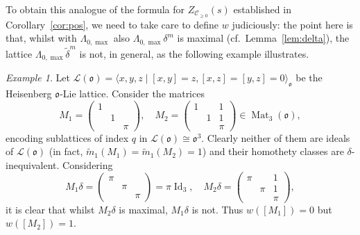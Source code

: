 \documentclass[11pt]{amsart}
\numberwithin{equation}{section}
\numberwithin{figure}{section}
\theoremstyle{plain}
\theoremstyle{definition}
\theoremstyle{remark}
\newtheorem{example}[theorem]{Example}
\begin{document}
To obtain this analogue of the formula for $Z_{{{\mathcal{C}}}_{\geq0}}(s)$
established in Corollary~\ref{cor:pos}, we need to take care to define
$w$ judiciously: the point here is that, whilst with
$\Lambda_{0,\max}$ also $\Lambda_{0,\max}\delta^m$ is maximal
(cf.\ Lemma~\ref{lem:delta}), the lattice
$\Lambda_{0,\max}{\widetilde{\delta}}^m$ is not, in general, as the following
example illustrates.

\begin{example}
  Let ${\ensuremath{\mathcal{L}}}({\mathfrak o}) = {\langle} x,y,z \mid [x,y]=z, [x,z]=[y,z]=0{\rangle}_{\mathfrak o}$ be
  the Heisenberg ${\mathfrak o}$-Lie lattice. Consider the matrices
$$ M_1 = \left( \begin{matrix}1&&\\&1&\\&&\pi\end{matrix}\right),
\quad M_2 =
\left( \begin{matrix}1&&1\\&1&1\\&&\pi\end{matrix}\right)\in\operatorname{Mat}_3({\mathfrak o}),$$
encoding sublattices of index $q$ in ${\ensuremath{\mathcal{L}}}({\mathfrak o})\cong {\mathfrak o}^3$.
Clearly neither of them are ideals of ${\ensuremath{\mathcal{L}}}({\mathfrak o})$ (in fact,
${\ensuremath{\widetilde{m}}}_1(M_1) = {\ensuremath{\widetilde{m}}}_1(M_2)=1$) and their homothety classes are
$\delta$-inequivalent. Considering $$ M_1\delta =
\left( \begin{matrix}\pi&&\\&\pi&\\&&\pi\end{matrix}\right)=\pi\operatorname{Id}_3,
\quad M_2\delta =
\left( \begin{matrix}\pi&&1\\&\pi&1\\&&\pi\end{matrix}\right),$$ it is
clear that whilst $M_2\delta$ is maximal, $M_1\delta$ is not. Thus
$w([M_1]) = 0$ but $w([M_2])=1$.
\end{example} 
\end{document}
